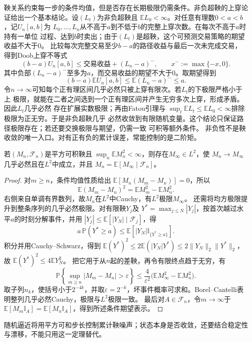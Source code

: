 鞅关系约束每一步的条件均值，但是否存在长期极限仍需条件。非负超鞅的上穿论证给出一个基本结论。设$(L_t)$为非负超鞅且
$\mathbb{E}L_0<\infty$。对任意有理数$0<a<b$，记$U_n[a,b]$为
$L_0,\ldots,L_n$从不高于$a$到不低于$b$的完整上穿次数。在每次不高于$a$时持有一单位
过程、达到$b$时卖出；由于$(L_t)$是超鞅，这个可预测交易策略的期望收益不大于$0$。
比较每次完整交易至少$b-a$的路径收益与最后一次未完成交易，得到Doob上穿不等式
\[
  (b-a)U_n[a,b]
  \leq
  \text{交易收益}+(L_n-a)^-,
  \qquad x^-:=\max\{-x,0\}.
\]
其中负部$(L_n-a)^-$至多为$a$，而交易收益的期望不大于$0$。取期望得到
\[
  (b-a)\mathbb{E}U_n[a,b]
  \leq
  \mathbb{E}(L_n-a)^-
  \leq
  a.
\]
令$n\to\infty$可知每个正有理区间几乎必然只被上穿有限次。若$L_t$的下极限严格小于上
极限，就能在二者之间选到一个正有理区间并产生无穷多次上穿，形成矛盾。因此$L_t$几乎必然
存在扩展实数极限；再由Fatou引理与
$\sup_t\mathbb{E}L_t\leq\mathbb{E}L_0<\infty$排除极限为正无穷。于是非负超鞅几乎
必然收敛到有限随机变量。这个结论只保证路径极限存在；若还要交换极限与期望，仍需一致
可积等额外条件。
非负性不是鞅收敛的唯一入口。对有正有负的累计误差，常能控制的是二阶矩。
\begin{theorem}[二阶矩有界鞅的收敛]
\label{thm:rv-l2-martingale-convergence}
若\((M_n,\mathcal F_n)\)是平方可积鞅且
\(\sup_n\mathbb E M_n^2<\infty\)，则存在\(M_\infty\in L^2\)，使
\(M_n\to M_\infty\)几乎必然且在\(L^2\)中成立，并且
\(M_n=\mathbb E[M_\infty\mid\mathcal F_n]\)。
\end{theorem}
\begin{proof}
对\(m\geq n\)，条件均值性质给出
\(\mathbb E[M_n(M_m-M_n)]=0\)，所以
\[
\mathbb E(M_m-M_n)^2=\mathbb EM_m^2-\mathbb EM_n^2.
\]
右侧来自单调有界数列，故\(M_n\)在\(L^2\)中Cauchy，有\(L^2\)极限\(M_\infty\)。
还需将均方极限提升到整条序列的几乎必然极限。对有限鞅\(Y_j\)及
\(Y^*=\max_{j\leq N}|Y_j|\)，按首次越过水平\(a\)的时刻分解事件，并用
\(|Y_j|\leq\mathbb E[|Y_N|\mid\mathcal F_j]\)，得
\[
a\,\mathbb P(Y^*\geq a)
\leq\mathbb E[|Y_N|\mathbb I_{\{Y^*\geq a\}}].
\]
积分并用Cauchy--Schwarz，得到
\(\mathbb E(Y^*)^2\leq2\mathbb E(|Y_N|Y^*)\leq
2\|Y_N\|_2\|Y^*\|_2\)，故
\(\mathbb E(Y^*)^2\leq4\mathbb E Y_N^2\)。
把它用于从\(n\)起的差鞅，再令有限终点趋于无穷，有
\[
\mathbb P\left\{\sup_{m\geq n}|M_m-M_n|>\varepsilon\right\}
\leq\frac4{\varepsilon^2}
\bigl(\mathbb EM_\infty^2-\mathbb EM_n^2\bigr).
\]
取子列\(n_k\)，使括号小于\(2^{-4k}\)，并取\(\varepsilon=2^{-k}\)，坏事件概率可求和。Borel--Cantelli表明整列几乎必然Cauchy，极限与\(L^2\)极限一致。
最后对\(A\in\mathcal F_n\)，令\(m\to\infty\)于
\(\mathbb E[M_m\mathbb I_A]=\mathbb E[M_n\mathbb I_A]\)，得到所述条件期望表示。
\end{proof}
随机逼近将用平方可和步长控制累计鞅噪声；状态本身是否收敛，还要结合稳定性与漂移，不能只用这一定理替代。

